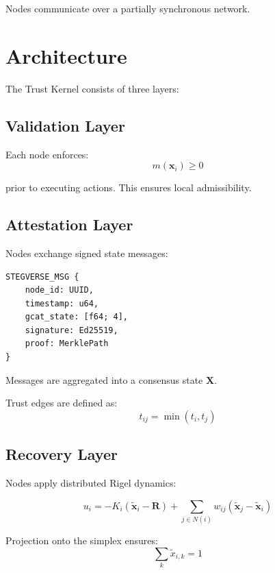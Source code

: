 \documentclass[letterpaper, 10 pt, conference]{ieeeconf}
\begin{document}
Nodes communicate over a partially synchronous network.

\section{Architecture}

The Trust Kernel consists of three layers:

\subsection{Validation Layer}

Each node enforces:
\begin{equation}
m(\mathbf{x}_i) \ge 0
\end{equation}

prior to executing actions. This ensures local admissibility.

\subsection{Attestation Layer}

Nodes exchange signed state messages:

\begin{verbatim}
STEGVERSE_MSG {
    node_id: UUID,
    timestamp: u64,
    gcat_state: [f64; 4],
    signature: Ed25519,
    proof: MerklePath
}
\end{verbatim}

Messages are aggregated into a consensus state $\mathbf{X}$.

Trust edges are defined as:
\begin{equation}
t_{ij} = \min(t_i, t_j)
\end{equation}

\subsection{Recovery Layer}

Nodes apply distributed Rigel dynamics:

\begin{equation}
u_i = -K_i(\tilde{\mathbf{x}}_i - \mathbf{R}) + \sum_{j \in N(i)} w_{ij} (\tilde{\mathbf{x}}_j - \tilde{\mathbf{x}}_i)
\end{equation}

Projection onto the simplex ensures:
\begin{equation}
\sum_k \tilde{x}_{i,k} = 1
\end{equation}
\end{document}

